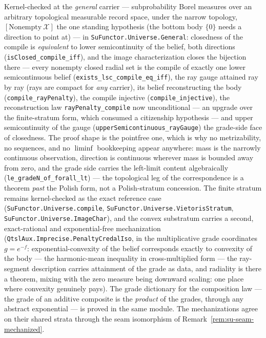 \begin{remark}
\label{rem:su-belief-iso-mechanized}
Kernel-checked at the \emph{general} carrier --- subprobability
Borel measures over an arbitrary topological measurable record
space, under the narrow topology, $[\mathrm{Nonempty}\
\mathcal{X}]$ the one standing hypothesis (the bottom body $\{0\}$
needs a direction to point at) --- in
\texttt{SuFunctor.Universe.General}: closedness of the compile is
\emph{equivalent} to lower semicontinuity of the belief, both
directions (\texttt{isClosed\_compile\_iff}), and the image
characterization closes the bijection there --- every nonempty
closed radial set is the compile of exactly one lower
semicontinuous belief (\texttt{exists\_lsc\_compile\_eq\_iff}),
the ray gauge attained ray by ray (rays are compact for \emph{any}
carrier), its belief reconstructing the body
(\texttt{compile\_rayPenalty}), the compile injective
(\texttt{compile\_injective}), the reconstruction law
\texttt{rayPenalty\_compile} now unconditional --- an upgrade over
the finite-stratum form, which consumed a citizenship hypothesis
--- and upper semicontinuity of the gauge
(\texttt{upperSemicontinuous\_rayGauge}) the grade-side face of
closedness. The proof shape is the pointfree one, which is why no metrizability, no sequences, and no
$\liminf$ bookkeeping appear anywhere: mass is the narrowly
continuous observation, direction is continuous wherever mass is
bounded away from zero, and the grade side carries the left-limit
content algebraically (\texttt{le\_gradeN\_of\_forall\_lt}) --- the
topological leg of the correspondence is a theorem \emph{past} the
Polish form, not a Polish-stratum concession. The finite stratum
remains kernel-checked as the exact reference case
(\texttt{SuFunctor.Universe.compile},
\texttt{SuFunctor.Universe.VietorisStratum},
\texttt{SuFunctor.Universe.ImageChar}), and the convex substratum
carries a second, exact-rational and exponential-free mechanization
(\texttt{QtslAux.Imprecise.PenaltyCredalIso}, in the multiplicative
grade coordinates $g = e^{-f}$: exponential-convexity of the
belief corresponds exactly to convexity of the body --- the
harmonic-mean inequality in cross-multiplied form --- the
ray-segment description carries attainment of the grade as data,
and radiality is there a theorem, mixing with the zero measure
being downward scaling: one place where convexity genuinely pays).
The grade dictionary for the composition law --- the grade of an
additive composite is the \emph{product} of the grades, through any
abstract exponential --- is proved in the same module. The
mechanizations agree on their shared strata
through the seam isomorphism of Remark~\ref{rem:su-seam-mechanized}.
\end{remark}

